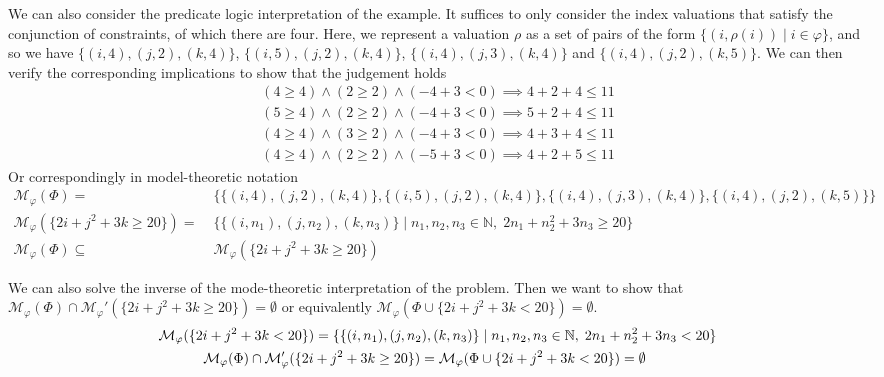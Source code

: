 \begin{examp}
    We can also consider the predicate logic interpretation of the example. It suffices to only consider the index valuations that satisfy the conjunction of constraints, of which there are four. Here, we represent a valuation $\rho$ as a set of pairs of the form $\{(i,\rho(i)) \mid i\in\varphi\}$, and so we have $\{(i,4),(j,2),(k,4)\}$, $\{(i,5),(j,2),(k,4)\}$, $\{(i,4),(j,3),(k,4)\}$ and $\{(i,4),(j,2),(k,5)\}$. We can then verify the corresponding implications to show that the judgement holds
    \begin{align*}
        (4 \geq 4) \land (2 \geq 2) \land ({-4}+3 < 0) \implies 4+2+4 \leq 11\\
        (5 \geq 4) \land (2 \geq 2) \land ({-4}+3 < 0) \implies 5+2+4 \leq 11\\
        (4 \geq 4) \land (3 \geq 2) \land ({-4}+3 < 0) \implies 4+3+4 \leq 11\\
        (4 \geq 4) \land (2 \geq 2) \land ({-5}+3 < 0) \implies 4+2+5 \leq 11
    \end{align*}
    Or correspondingly in model-theoretic notation
    {\small
    \begin{align*}
        \mathcal{M}_\varphi(\Phi) =&\; \{\{(i,4),(j,2),(k,4)\}, \{(i,5),(j,2),(k,4)\}, \{(i,4),(j,3),(k,4)\}, \{(i,4),(j,2),(k,5)\}\}\\
        \mathcal{M}_\varphi(\{2i+j^2+3k\geq 20\}) =&\; \{\{(i,n_1),(j,n_2),(k,n_3)\} \mid n_1,n_2,n_3\in\mathbb{N},\; 2n_1 + n_2^2 + 3n_3 \geq 20 \}\\
        \mathcal{M}_\varphi(\Phi) \subseteq&\; \mathcal{M}_\varphi(\{2i+j^2+3k\geq 20\})
    \end{align*}}
    
    We can also solve the inverse of the mode-theoretic interpretation of the problem. Then we want to show that $\mathcal{M}_\varphi(\Phi) \cap \mathcal{M}_\varphi'(\{2i+j^2+3k\geq 20\}) = \emptyset$ or equivalently $\mathcal{M}_\varphi(\Phi \cup \{2i+j^2+3k < 20\}) = \emptyset$. 
    \begin{align*}
        \mathcal{M}_\varphi(\{2i+j^2+3k < 20\}) =&\; \{\{(i,n_1),(j,n_2),(k,n_3)\} \mid n_1,n_2,n_3\in\mathbb{N},\; 2n_1 + n_2^2 + 3n_3 < 20 \}\\
        &\kern-9em\mathcal{M}_\varphi(\Phi) \cap \mathcal{M}_\varphi'(\{2i+j^2+3k\geq 20\}) = \mathcal{M}_\varphi(\Phi \cup \{2i+j^2+3k < 20\}) = \emptyset
    \end{align*}
\end{examp}